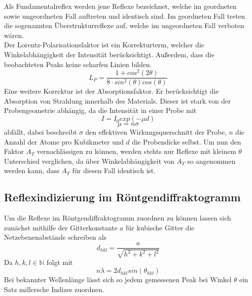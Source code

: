             Als Fundamentalreflex werden jene Reflexe bezeichnet, welche im geordneten sowie ungeordneten
            Fall auftreten und identisch sind. Im geordneten Fall treten die sogenannten Überstrukturreflexe
            auf, welche im ungeordneten Fall verboten wären.\\

            Der Lorentz-Polarisationsfaktor ist ein Korrekturterm, welcher die Winkelabhängigkeit der Intensität berücksichtigt. Außerdem,
            dass die beobachteten Peaks keine scharfen Linien bilden.
            \begin{equation}
                L_P = \frac{1 + cos^2(2 \theta)}{8 \cdot sin^2(\theta) cos(\theta)}
                \label{Lorentz-Polarisationsfaktor}
            \end{equation}
            Eine weitere Korrektur ist der Absorptionsfaktor. Er berücksichtigt die Absorption von Strahlung innerhalb des Materials.
            Dieser ist stark von der Probengeometrie abhängig, da die Intensität in einer Probe mit
            $$ I = I_0 exp(-\mu d)$$
            $$ \mu = n \sigma$$
            abfällt, dabei beschreibt $\sigma$ den effektiven Wirkungsquerschnitt der Probe, $n$ die Anzahl der Atome pro Kubikmeter und $d$ die Probendicke selbst.
            Um nun den Faktor $A_T$ vernachlässigen zu können, werden stehts nur Reflexe mit kleinem $\theta$ Unterschied verglichen, da
            über Winkelabhängigkeit von $A_T$ so angenommen werden kann, dass $A_T$ für diesen Fall identisch ist.
            
        \subsection{Reflexindizierung im Röntgendiffraktogramm}
            Um die Reflexe im Röntgendiffraktogramm zuordnen zu können lassen sich zunächst mithilfe der Gitterkonstante $a$ für
            kubische Gitter die Netzebenenabstände schreiben als
            \begin{equation}
                d_{hkl} = \frac{a}{\sqrt{h^2+k^2+l^2}}
            \end{equation}
            Da $h,k,l\in \mathbb{N} $ folgt mit
            \begin{equation}
                n\lambda = 2d_{hkl}sin(\theta_{hkl})
            \end{equation}
            Bei bekannter Wellenlänge lässt sich so jedem gemessenen Peak bei Winkel $\theta$ ein Satz millersche Indizes
            zuordnen.
        

